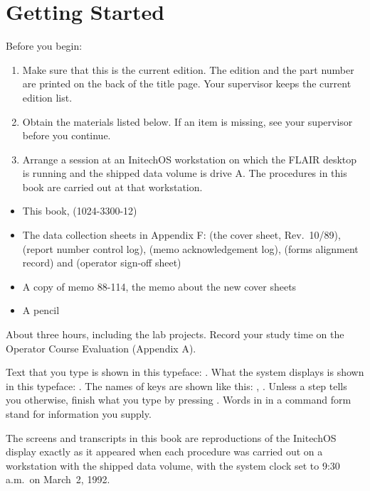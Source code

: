 \section{Getting Started}
Before you begin:
\begin{enumerate}
\item Make sure that this is the current edition.  The edition and the
  part number are printed on the back of the title page.  Your supervisor
  keeps the current edition list.
\item Obtain the materials listed below.  If an item is missing, see your
  supervisor before you continue.
\item Arrange a session at an InitechOS workstation on which the FLAIR
  desktop is running and the shipped data volume is drive A.  The
  procedures in this book are carried out at that workstation.
\end{enumerate}

\begin{itemize}
\item This book,  (1024-3300-12)
\item The data collection sheets in Appendix F:  (the cover sheet,
  Rev.\ 10/89),  (report number control log),  (memo
  acknowledgement log),  (forms alignment record) and 
  (operator sign-off sheet)
\item A copy of memo 88-114, the memo about the new cover sheets
\item A pencil
\end{itemize}

About three hours, including the lab projects.
Record your study time on the Operator Course Evaluation (Appendix A).

Text that you type is shown in this typeface:
.  What the system displays is shown in this
typeface: .  The names of keys are shown like this:
, .  Unless a step tells you otherwise, finish
what you type by pressing .  Words in  in a command
form stand for information you supply.

The screens and transcripts in this book are
reproductions of the InitechOS display exactly as it appeared when each
procedure was carried out on a workstation with the shipped data volume,
with the system clock set to 9:30 a.m.\ on March~2, 1992.

